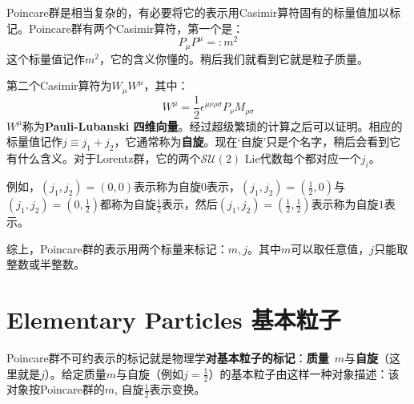 Poincare群是相当复杂的，有必要将它的表示用Casimir算符固有的标量值加以标记。Poincare群有两个Casimir算符，第一个是：
\begin{equation}
\label{equ3.258}
    P_\mu P^\mu =: m^2
\end{equation}
这个标量值记作$m^2$，它的含义你懂的。稍后我们就看到它就是粒子质量。

第二个Casimir算符为$W_\mu W^\mu$，其中：
\begin{equation}
\label{equ3.259}
    W^\mu = \frac{1}{2} \epsilon^{\mu \nu \rho \sigma} P_{\nu} M_{\rho \sigma}
\end{equation}
$W^\mu$称为{\bf Pauli-Lubanski 四维向量}。经过超级繁琐的计算之后可以证明。相应的标量值记作$j \equiv j_1 + j_2$，它通常称为{\bf 自旋}。现在`自旋'只是个名字，稍后会看到它有什么含义。对于Lorentz群，它的两个$\mathcal{SU}(2)$ Lie代数每个都对应一个$j_i$。

例如，$(j_1, j_2) = (0, 0)$表示称为自旋$0$表示，$(j_1, j_2) = (\frac{1}{2}, 0)$与$(j_1, j_2) = (0, \frac{1}{2})$都称为自旋$\frac{1}{2}$表示，然后$(j_1, j_2) = (\frac{1}{2}, \frac{1}{2})$表示称为自旋$1$表示。

综上，Poincare群的表示用两个标量来标记：$m, j$。其中$m$可以取任意值，$j$只能取整数或半整数。

\section[基本粒子]{Elementary Particles \quad 基本粒子}
\label{equ3.9}
Poincare群不可约表示的标记就是物理学{\bf 对基本粒子的标记}：{\bf 质量}\, $m$与{\bf 自旋}（这里就是$j$）。给定质量$m$与自旋（例如$j = \frac{1}{2}$）的基本粒子由这样一种对象描述：该对象按Poincare群的$m$, 自旋$\frac{1}{2}$表示变换。

